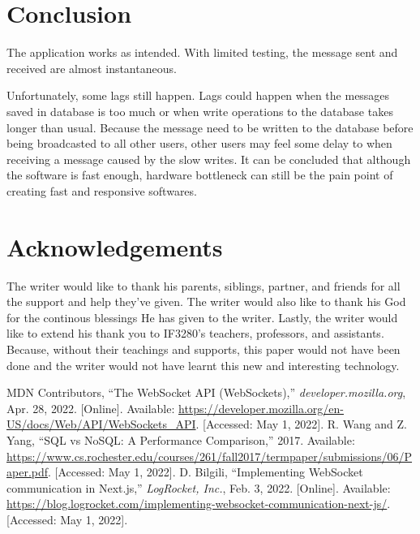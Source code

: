 \documentclass[conference]{IEEEtran}
\begin{document}
\section{Conclusion}

The application works as intended. With limited testing, the message sent and received
are almost instantaneous.

Unfortunately, some lags still happen. Lags could happen when the messages saved in
database is too much or when write operations to the database takes longer than usual.
Because the message need to be written to the database before being broadcasted to all
other users, other users may feel some delay to when receiving a message caused by the
slow writes. It can be concluded that although the software is fast enough, hardware
bottleneck can still be the pain point of creating fast and responsive softwares.

\section*{Acknowledgements}

The writer would like to thank his parents, siblings, partner, and friends for all
the support and help they've given. The writer would also like to thank his God
for the continous blessings He has given to the writer. Lastly, the writer would like
to extend his thank you to IF3280's teachers, professors, and assistants. Because,
without their teachings and supports, this paper would not have been done and the writer
would not have learnt this new and interesting technology.

\begin{thebibliography}{00}
 MDN Contributors, ``The WebSocket API (WebSockets),''
    \textit{developer.mozilla.org}, Apr. 28, 2022. [Online].
    Available: \url{https://developer.mozilla.org/en-US/docs/Web/API/WebSockets\_API}.
    [Accessed: May 1, 2022].
 R. Wang and Z. Yang, ``SQL vs NoSQL: A Performance Comparison,'' 2017.
    Available: \url{https://www.cs.rochester.edu/courses/261/fall2017/termpaper/submissions/06/Paper.pdf}.
    [Accessed: May 1, 2022].
 D. Bilgili, ``Implementing WebSocket communication in Next.js,''
    \textit{LogRocket, Inc.}, Feb. 3, 2022. [Online]. Available:
    \url{https://blog.logrocket.com/implementing-websocket-communication-next-js/}.
    [Accessed: May 1, 2022].
\end{thebibliography}
\end{document}
